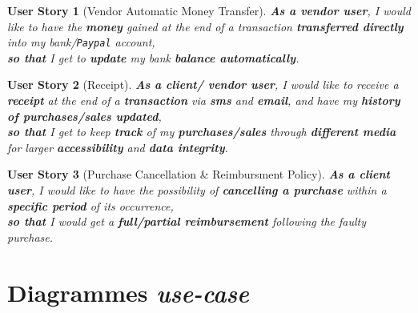 \documentclass[a4paper,12pt]{book}
\theoremstyle{break}
\newtheorem{userStory}{User Story}
\theoremstyle{break}
\theoremstyle{break}
\theoremstyle{break}
\theoremstyle{definition}
\theoremstyle{remark}
\begin{document}
\begin{userStory}[Vendor Automatic Money Transfer]
\textbf{As a {\color{red} vendor} user}, I would like to have the \textbf{money} gained at the end of a transaction \textbf{transferred directly} into my bank/\texttt{Paypal} account,\\
\indent
\textbf{so that} I get to \textbf{update} my bank \textbf{balance automatically}.
\end{userStory}

\begin{userStory}[Receipt]
\textbf{As a {\color{green} client}/{\color{red} vendor} user}, I would like to receive a \textbf{receipt} at the end of a \textbf{transaction} via \textbf{sms} and \textbf{email}, and have my \textbf{history of purchases/sales updated},\\
\indent
\textbf{so that} I get to keep \textbf{track} of my \textbf{purchases/sales} through \textbf{different media} for larger \textbf{accessibility} and \textbf{data integrity}.
\end{userStory}

\begin{userStory}[Purchase Cancellation \& Reimbursment Policy]
\textbf{As a {\color{green} client} user}, I would like to have the possibility of \textbf{cancelling a purchase} within a \textbf{specific period} of its occurrence,\\
\indent
\textbf{so that} I would get a \textbf{full/partial reimbursement} following the faulty purchase.
\end{userStory}

\section{Diagrammes \textit{use-case}}
\end{document}
